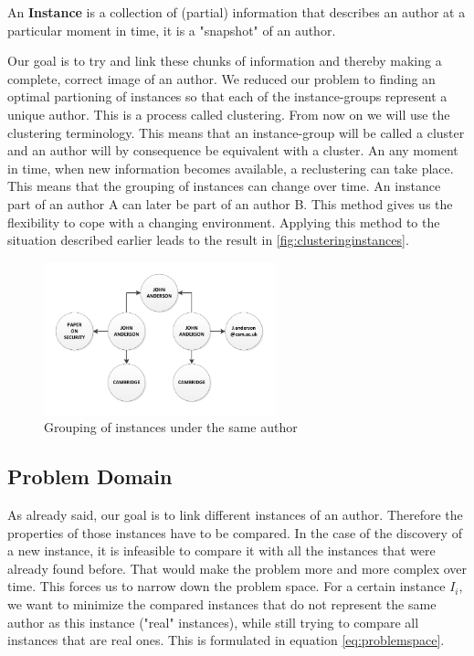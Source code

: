 \begin{mydef}
An \textbf{Instance} is a collection of (partial) information that describes an author at a particular moment in time, it is a "snapshot" of an author.
\end{mydef}

Our goal is to try and link these chunks of information and thereby making a complete, correct image of an author. We reduced our problem to finding an optimal partioning of instances so that each of the instance-groups represent a unique author. This is a process called clustering. From now on we will use the clustering terminology. This means that an instance-group will be called a cluster and an author will by consequence be equivalent with a cluster. An any moment in time, when new information becomes available, a reclustering can take place. This means that the grouping of instances can change over time. An instance part of an author A can later be part of an author B. This method gives us the flexibility to cope with a changing environment. Applying this method to the situation described earlier leads to the result in \autoref{fig:clusteringinstances}.

\begin{figure}[htb]
	\centering
		\includegraphics[width=0.6\textwidth]{fig/clusteringinstances}
	\caption{Grouping of instances under the same author}
	\label{fig:clusteringinstances}
\end{figure}

\subsection{Problem Domain}

As already said, our goal is to link different instances of an author. Therefore the properties of those instances have to be compared. In the case of the discovery of a new instance, it is infeasible to compare it with all the instances that were already found before. That would make the problem more and more complex over time. This forces us to narrow down the problem space. For a certain instance $I_i$, we want to minimize the compared instances that do not represent the same author as this instance ("real" instances), while still trying to compare all instances that are real ones. This is formulated in equation \autoref{eq:problemspace}.

